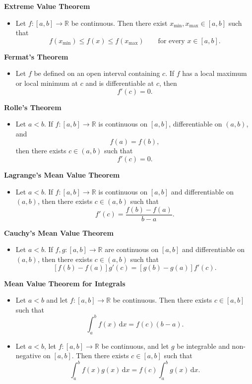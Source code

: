\documentclass[11pt,a4paper,fleqn]{article}
\newcommand{\dd}{\,\mathrm{d}}
\newcommand{\theoremheading}[1]{%
  \Needspace{7\baselineskip}%
  \par\vspace{0.3em}\noindent\textbf{#1}\par\nobreak\vspace{-0.25em}%
}
\newenvironment{theoremlist}
  {\begingroup
   \setlength{\abovedisplayskip}{0.3em}%
   \setlength{\belowdisplayskip}{0.3em}%
   \setlength{\abovedisplayshortskip}{0.2em}%
   \setlength{\belowdisplayshortskip}{0.2em}%
   \begin{itemize}[
      label=\(\bullet\),
      leftmargin=1.65em,
      labelsep=0.55em,
      itemsep=0.3em,
      topsep=0pt,
      parsep=0pt,
      partopsep=0pt
    ]}
  {\end{itemize}\endgroup}
\begin{document}
\theoremheading{Extreme Value Theorem}
\begin{theoremlist}
\item Let \(f:[a,b]\to\mathbb R\) be continuous. Then there exist
      \(x_{\min},x_{\max}\in[a,b]\) such that
      \[
      f(x_{\min})\le f(x)\le f(x_{\max})
      \qquad\text{for every }x\in[a,b].
      \]
\end{theoremlist}

\theoremheading{Fermat's Theorem}
\begin{theoremlist}
\item Let \(f\) be defined on an open interval containing \(c\).
      If \(f\) has a local maximum or local minimum at \(c\) and is
      differentiable at \(c\), then
      \[
      f'(c)=0.
      \]
\end{theoremlist}

\theoremheading{Rolle's Theorem}
\begin{theoremlist}
\item Let \(a<b\). If \(f:[a,b]\to\mathbb R\) is continuous on
      \([a,b]\), differentiable on \((a,b)\), and
      \[
      f(a)=f(b),
      \]
      then there exists \(c\in(a,b)\) such that
      \[
      f'(c)=0.
      \]
\end{theoremlist}

\theoremheading{Lagrange's Mean Value Theorem}
\begin{theoremlist}
\item Let \(a<b\). If \(f:[a,b]\to\mathbb R\) is continuous on
      \([a,b]\) and differentiable on \((a,b)\), then there exists
      \(c\in(a,b)\) such that
      \[
      f'(c)=\frac{f(b)-f(a)}{b-a}.
      \]
\end{theoremlist}

\theoremheading{Cauchy's Mean Value Theorem}
\begin{theoremlist}
\item Let \(a<b\). If \(f,g:[a,b]\to\mathbb R\) are continuous on
      \([a,b]\) and differentiable on \((a,b)\), then there exists
      \(c\in(a,b)\) such that
      \[
      [f(b)-f(a)]g'(c)=[g(b)-g(a)]f'(c).
      \]
\end{theoremlist}

\theoremheading{Mean Value Theorem for Integrals}
\begin{theoremlist}
\item Let \(a<b\) and let \(f:[a,b]\to\mathbb R\) be continuous.
      Then there exists \(c\in[a,b]\) such that
      \[
      \int_a^b f(x)\dd x=f(c)(b-a).
      \]
\item Let \(a<b\), let \(f:[a,b]\to\mathbb R\) be continuous, and let \(g\) be
      integrable and non-negative on \([a,b]\). Then there exists
      \(c\in[a,b]\) such that
      \[
      \int_a^b f(x)g(x)\dd x
      =f(c)\int_a^b g(x)\dd x.
      \]
\end{theoremlist}
\end{document}
